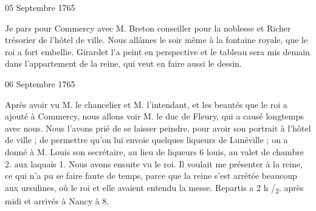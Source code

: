                      \begin{diary}{05 Septembre 1765}{}

                         Je pars pour Commercy avec M.
                              Breton
                           conseiller pour la noblesse et Richer
                           trésorier de
                           l'hôtel de ville. Nous allâmes le
                           soir même
                           à la fontaine royale, que le
                              roi a fort embellie. Girardet l'a peint en
                           perspective
                           et le tableau sera mis demain dans l'appartement
                           de la reine, qui veut
                           en faire aussi le dessin. \bigskip


                     \end{diary}

                     \begin{diary}{06 Septembre 1765}{}

                         Après avoir vu M. le chancelier et M.
                              l'intendant, et les beautés que le roi a ajouté
                           à Commercy, nous allons voir
                              M. le duc de
                              Fleury, qui a causé longtemps avec nous. Nous
                           l'avons prié de se laisser peindre, pour avoir
                           son portrait à l'hôtel de
                              ville ; de permettre
                           qu'on lui envoie quelques liqueurs de Lunéville ;
                           on a donné à M. Louis son
                           secrétaire, au
                           lieu de liqueurs 6 louis, au valet de chambre
                           2. aux
                           laquais 1.
                           Nous avons ensuite vu
                           le roi. Il voulait me
                           présenter à la reine,
                           ce qui n'a pu se faire faute de temps,
                           parce que la reine
                           s'est arrêtée beaucoup
                           aux ursulines, où le roi et elle avaient
                           entendu la messe. Repartis a 2 h /\textsubscript{2}. après
                           midi et arrivés à Nancy à 8.
                        \bigskip


                     \end{diary}

